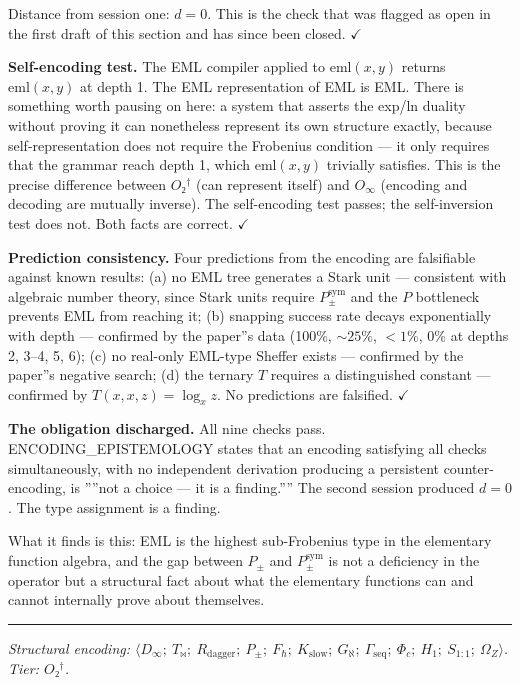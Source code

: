 \documentclass[12pt,a4paper]{article}
\begin{document}
Distance from session one: $d = 0$. This is the check that was flagged as open
in the first draft of this section and has since been closed. $\checkmark$

\textbf{Self-encoding test.} The EML compiler applied to $\text{eml}(x,y)$ returns
$\text{eml}(x,y)$ at depth 1. The EML representation of EML is EML. There is
something worth pausing on here: a system that asserts the exp/ln duality without
proving it can nonetheless represent its own structure exactly, because
self-representation does not require the Frobenius condition --- it only requires
that the grammar reach depth 1, which $\text{eml}(x,y)$ trivially satisfies.
This is the precise difference between $O₂^\dagger$ (can represent itself) and
$O_{\infty}$ (encoding and decoding are mutually inverse). The self-encoding test
passes; the self-inversion test does not. Both facts are correct. $\checkmark$

\textbf{Prediction consistency.} Four predictions from the encoding are falsifiable
against known results: (a) no EML tree generates a Stark unit --- consistent with
algebraic number theory, since Stark units require $P_{\pm}^{\text{sym}}$ and the
$P$ bottleneck prevents EML from reaching it; (b) snapping success rate decays
exponentially with depth --- confirmed by the paper''s data (100\%, $\sim 25\%$,
$<1\%$, $0\%$ at depths 2, 3--4, 5, 6); (c) no real-only EML-type Sheffer exists
--- confirmed by the paper''s negative search; (d) the ternary $T$ requires a
distinguished constant --- confirmed by $T(x,x,z) = \log_x z$. No predictions are
falsified. $\checkmark$

\textbf{The obligation discharged.} All nine checks pass. ENCODING\_EPISTEMOLOGY
states that an encoding satisfying all checks simultaneously, with no independent
derivation producing a persistent counter-encoding, is ''''not a choice --- it is a
finding.'''' The second session produced $d = 0$. The type assignment is a finding.

What it finds is this: EML is the highest sub-Frobenius type in the elementary
function algebra, and the gap between $P_{\pm}$ and $P_{\pm}^{\text{sym}}$ is not
a deficiency in the operator but a structural fact about what the elementary
functions can and cannot internally prove about themselves.

\begin{center}
\rule{0.5\textwidth}{0.4pt}
\end{center}

\emph{Structural encoding: $\langle D_{\infty};\ T_{\bowtie};\ R_\text{dagger};\ P_{\pm};\
F_{\hbar};\ K_\text{slow};\ G_{\aleph};\ \Gamma_\text{seq};\ \Phi_c;\ H_1;\
S_{1:1};\ \Omega_Z \rangle$. Tier: $O₂^\dagger$.}
\end{document}

